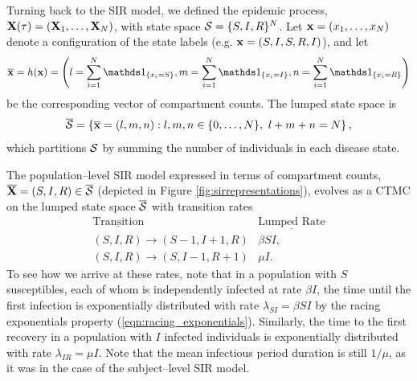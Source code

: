 Turning back to the SIR model, we defined the epidemic process, $ \mathbf{X}(\tau) = (\mathbf{X}_1,\dots,\mathbf{X}_N)$, with state space $ \mathcal{S} = \lbrace S, I, R\rbrace^N $. Let $ \mathbf{x} = (x_1,\dots,x_N) $ denote a configuration of the state labels (e.g. $ \mathbf{x} = (S, I, S, R, I) $), and let $$ \overline{\bx} = h(\bx) = \left (l=\sum_{i=1}^N\ind{x_i = S},m=\sum_{i=1}^N\ind{x_i=I},n = \sum_{i=1}^N\ind{x_i=R}\right ) $$ be the corresponding vector of compartment counts. The lumped state space is 
$$ \overline{\mathcal{S}} = \left \lbrace \overline{\mathbf{x}} = (l,m,n): l,m,n \in \lbrace0,\dots,N\rbrace,\  l+m+n = N \right \rbrace, $$ 
which partitions $ \mathcal{S} $ by summing the number of individuals in each disease state. 

The population--level SIR model expressed in terms of compartment counts, $ \overline{\mathbf{X}} = (S, I, R) \in \overline{\mathcal{S}} $ (depicted in Figure \ref{fig:sirrepresentations}), evolves as a CTMC on the lumped state space $ \overline{\mathcal{S}} $ with transition rates
\begin{equation*}
\begin{array}{cc}
\underline{\text{Transition}} & \underline{\text{Lumped Rate}} \\
(S,I,R) \longrightarrow (S-1,I+1,R) & \beta S I ,\\
(S,I,R) \longrightarrow (S,I-1,R+1) & \mu I .
\end{array}
\end{equation*}
To see how we arrive at these rates, note that in a population with $ S $ susceptibles, each of whom is independently infected at rate $ \beta I $, the time until the first infection is exponentially distributed with rate $ \lambda_{SI} = \beta SI $ by the racing exponentials property (\ref{eqn:racing_exponentials}). Similarly, the time to the first recovery in a population with $ I $ infected individuals is exponentially distributed with rate $\lambda_{IR} = \mu I $. Note that the mean infectious period duration is still $ 1/\mu $, as it was in the case of the subject--level SIR model.

